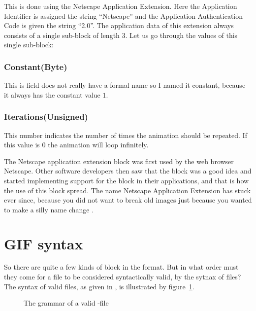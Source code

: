 This is done using the Netscape Application Extension. Here the
Application Identifier is assigned the string ``Netscape'' and the
Application Authentication Code is given the string ``2.0''. The
application data of this extension always consists of a single
sub-block of length 3. Let us go through the values of this single
sub-block: \cite{frazier97:_all_about_gif89}

\subsubsection{Constant(Byte)}

This is field does not really have a formal name so I named it
constant, because it always has the constant value $1$.

\subsubsection{Iterations(Unsigned)}

This number indicates the number of times the animation should be
repeated. If this value is $0$ the animation will loop infinitely.

The Netscape application extension block was first used by the web
browser Netscape. Other software developers then saw that the block
was a good idea and started implementing support for the block in
their applications, and that is how the use of this block spread. The
name Netscape Application Extension has stuck ever since, because you
did not want to break old \gif images just because you wanted to make a silly
name change \cite{walte96:_web_scrip_secret_weapon}.

\section{GIF syntax}
\label{sec:gif-syntax}

So there are quite a few kinds of block in the \gif format. But in
what order must they come for a \gif file to be considered
syntactically valid, by the sytnax of \gif files? The syntax of valid
\gif files, as given in \cite{gif89a}, is illustrated by
figure~\ref{fig:gif-grammar}.

\begin{figure}
  \centering


  \caption{The grammar of a valid \gif-file}
  \label{fig:gif-grammar}
\end{figure}

